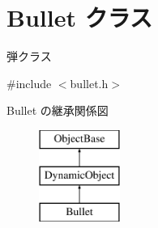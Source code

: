 \hypertarget{class_bullet}{}\section{Bullet クラス}
\label{class_bullet}


弾クラス  




{\ttfamily \#include $<$bullet.\+h$>$}

Bullet の継承関係図\begin{figure}[H]
\begin{center}
\leavevmode
\includegraphics[height=3.000000cm]{class_bullet}
\end{center}
\end{figure}
